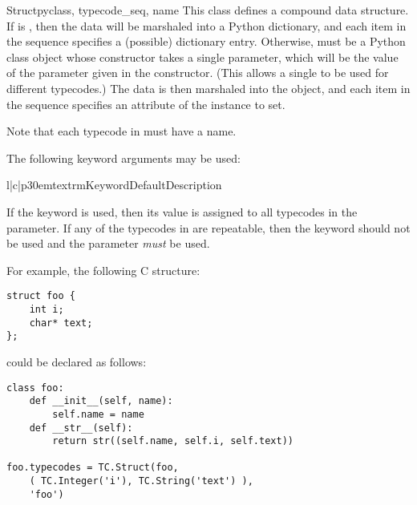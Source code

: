 \begin{classdesc}{Struct}{pyclass, typecode_seq, name}
This class defines a compound data structure.
If  is , then the data will be marshaled
into a Python dictionary, and each item in the  sequence
specifies a (possible) dictionary entry.
Otherwise,  must be a Python class object whose constructor
takes a single parameter, which will be the value of the 
parameter given in the  constructor.
(This allows a single  to be used for different typecodes.)
The data is then marshaled into the object, and each item in the
sequence specifies an attribute of the instance to set.

Note that each typecode in  must have a name.

The following keyword arguments may be used:

\begin{tableiii}{l|c|p{30em}}{textrm}{Keyword}{Default}{Description}
\end{tableiii}

If the  keyword is used, then its value is assigned to
all typecodes in the  parameter.
If any of the typecodes in  are repeatable, then the
 keyword should not be used and the  parameter
\emph{must} be used.

For example, the following C structure:
\begin{verbatim}
struct foo {
    int i;
    char* text;
};
\end{verbatim}
could be declared as follows:
\begin{verbatim}
class foo:
    def __init__(self, name):
        self.name = name
    def __str__(self):
        return str((self.name, self.i, self.text))

foo.typecodes = TC.Struct(foo,
    ( TC.Integer('i'), TC.String('text') ),
    'foo')
\end{verbatim}
\end{classdesc}

